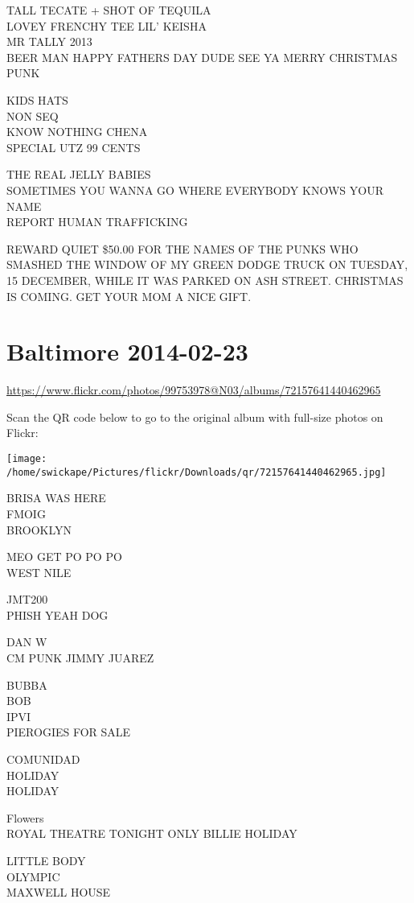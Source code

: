 \documentclass[10pt,letterpaper]{article}
\begin{document}
TALL TECATE + SHOT OF TEQUILA\\
LOVEY FRENCHY TEE LIL' KEISHA\\
MR TALLY 2013\\
BEER MAN HAPPY FATHERS DAY DUDE SEE YA MERRY CHRISTMAS PUNK

KIDS HATS\\
NON SEQ\\
KNOW NOTHING CHENA\\
SPECIAL UTZ 99 CENTS

THE REAL JELLY BABIES\\
SOMETIMES YOU WANNA GO WHERE EVERYBODY KNOWS YOUR NAME\\
REPORT HUMAN TRAFFICKING

REWARD QUIET \$50.00 FOR THE NAMES OF THE PUNKS WHO SMASHED THE WINDOW OF MY GREEN DODGE TRUCK ON TUESDAY, 15 DECEMBER, WHILE IT WAS PARKED ON ASH STREET.  CHRISTMAS IS COMING.  GET YOUR MOM A NICE GIFT.


\section*{Baltimore 2014-02-23}

\url{https://www.flickr.com/photos/99753978@N03/albums/72157641440462965}

Scan the QR code below to go to the original album with full-size photos on Flickr:

\texttt{[image: /home/swickape/Pictures/flickr/Downloads/qr/72157641440462965.jpg]}


BRISA WAS HERE\\
FMOIG\\
BROOKLYN

MEO GET PO PO PO\\
WEST NILE

JMT200\\
PHISH YEAH DOG

DAN W\\
CM PUNK JIMMY JUAREZ

BUBBA\\
BOB\\
IPVI\\
PIEROGIES FOR SALE

COMUNIDAD\\
HOLIDAY\\
HOLIDAY

Flowers\\
ROYAL THEATRE TONIGHT ONLY BILLIE HOLIDAY

LITTLE BODY\\
OLYMPIC\\
MAXWELL HOUSE
\end{document}
